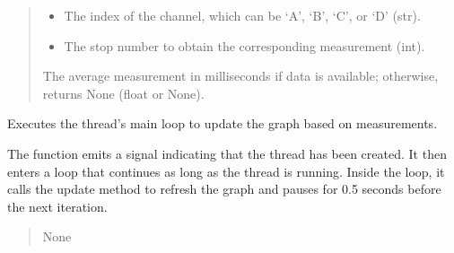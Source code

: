 \documentclass[letterpaper,10pt,english]{sphinxmanual}
\begin{document}
\begin{fulllineitems}
\begin{fulllineitems}
\begin{quote}
\begin{description}
\begin{itemize}
\item {} 
\sphinxAtStartPar
{} \textendash{} The index of the channel, which can be ‘A’, ‘B’, ‘C’, or ‘D’ (str).

\item {} 
\sphinxAtStartPar
{} \textendash{} The stop number to obtain the corresponding measurement (int).

\end{itemize}

\sphinxAtStartPar
The average measurement in milliseconds if data is available; otherwise, returns None (float or None).

\end{description}\end{quote}

\end{fulllineitems}


\begin{fulllineitems}
\label{\detokenize{StartStopHist:StartStopHist.WorkerThreadStartStopHistogram.newMaxValueSignal}}
\pysigstartsignatures
{}
\pysigstopsignatures
\end{fulllineitems}


\begin{fulllineitems}
\label{\detokenize{StartStopHist:StartStopHist.WorkerThreadStartStopHistogram.run}}
\pysigstartsignatures
{}
\pysigstopsignatures
\sphinxAtStartPar
Executes the thread’s main loop to update the graph based on measurements.

\sphinxAtStartPar
The function emits a signal indicating that the thread has been created. It then enters a 
loop that continues as long as the thread is running. Inside the loop, it calls the update 
method to refresh the graph and pauses for 0.5 seconds before the next iteration.
\begin{quote}\begin{description}
\sphinxAtStartPar
None


\end{description}
\end{quote}
\end{fulllineitems}
\end{fulllineitems}
\end{document}
